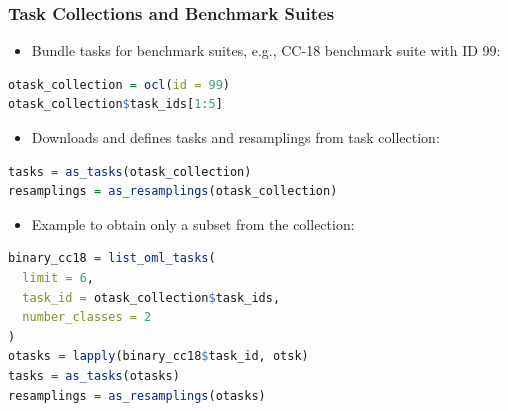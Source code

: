 \documentclass[10pt,compress,t,notes=noshow, xcolor=table]{beamer}
\begin{document}
\begin{frame}[fragile]
\frametitle{Task Collections and Benchmark Suites}
\begin{itemize}
  \item Bundle tasks for benchmark suites, e.g., CC-18 benchmark suite with ID 99:
\end{itemize}
\begin{lstlisting}[language=R]
otask_collection = ocl(id = 99)
otask_collection$task_ids[1:5]
\end{lstlisting}
\begin{itemize}
  \item Downloads and defines tasks and resamplings from task collection:
\end{itemize}
\begin{lstlisting}[language=R]
tasks = as_tasks(otask_collection)
resamplings = as_resamplings(otask_collection)
\end{lstlisting}

\begin{itemize}
  \item Example to obtain only a subset from the collection:
\end{itemize}
\begin{lstlisting}[language=R]
binary_cc18 = list_oml_tasks(
  limit = 6,
  task_id = otask_collection$task_ids,
  number_classes = 2
)
otasks = lapply(binary_cc18$task_id, otsk)
tasks = as_tasks(otasks)
resamplings = as_resamplings(otasks)
\end{lstlisting}
\end{frame}


\end{document}
